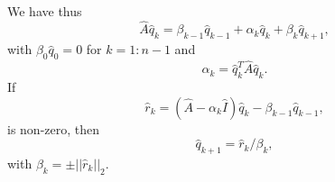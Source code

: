 \paragraph{}
We have thus
\[
\hat{A}\hat{q}_k=\beta_{k-1}\hat{q}_{k-1}+\alpha_k\hat{q}_k+\beta_k\hat{q}_{k+1},
\]
with $\beta_0\hat{q}_0=0$ for $k=1:n-1$ and 
\[
\alpha_k=\hat{q}_k^T\hat{A}\hat{q}_k.
\]
If 
\[
\hat{r}_k=(\hat{A}-\alpha_k\hat{I})\hat{q}_k-\beta_{k-1}\hat{q}_{k-1},
\]
is non-zero, then 
\[
\hat{q}_{k+1}=\hat{r}_{k}/\beta_k,
\]
with $\beta_k=\pm ||\hat{r}_{k}||_2$.







